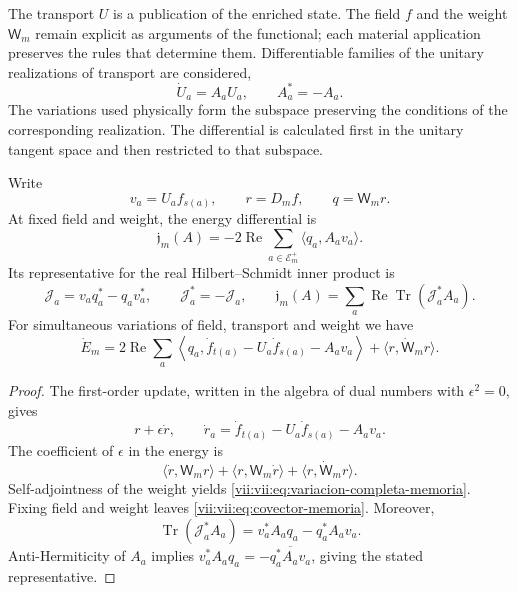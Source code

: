 The transport \(U\) is a publication of the enriched state. The field
\(f\) and the weight \(\mathsf W_m\) remain explicit as arguments
of the functional; each material application preserves the rules that
determine them. Differentiable families of the unitary realizations
of transport are considered,
\[
 \dot U_a=A_aU_a,\qquad A_a^*=-A_a.
\]
The variations used physically form the subspace preserving
the conditions of the corresponding realization. The differential is
calculated first in the unitary tangent space and then restricted
to that subspace.

\begin{proposition}
\label{vii:vii:prop:covector-memoria}
Write
\[
 v_a=U_af_{s(a)},\qquad r=D_mf,\qquad q=\mathsf W_mr.
\]
At fixed field and weight, the energy differential is
\begin{equation}
 \mathfrak j_m(A)=-2\operatorname{Re}
       \sum_{a\in\mathcal E_m^+}\langle q_a,A_av_a\rangle .
 \label{vii:vii:eq:covector-memoria}
\end{equation}
Its representative for the real Hilbert--Schmidt inner product is
\begin{equation}
 \mathcal J_a=v_aq_a^*-q_av_a^*,\qquad
 \mathcal J_a^*=-\mathcal J_a,\qquad
 \mathfrak j_m(A)=
 \sum_a\operatorname{Re}\operatorname{Tr}(\mathcal J_a^*A_a).
 \label{vii:vii:eq:representante-corriente-discreta}
\end{equation}
For simultaneous variations of field, transport and weight we have
\begin{equation}
 \dot E_m=
 2\operatorname{Re}\sum_a
 \left\langle q_a,\dot f_{t(a)}-U_a\dot f_{s(a)}-A_av_a\right\rangle
 +\langle r,\dot{\mathsf W}_mr\rangle .
 \label{vii:vii:eq:variacion-completa-memoria}
\end{equation}
\end{proposition}

\begin{proof}
The first-order update, written in the algebra of dual
numbers with \(\epsilon^2=0\), gives
\[
 r+\epsilon\dot r,\qquad
 \dot r_a=\dot f_{t(a)}-U_a\dot f_{s(a)}-A_av_a.
\]
The coefficient of \(\epsilon\) in the energy is
\[
 \langle\dot r,\mathsf W_mr\rangle+
 \langle r,\mathsf W_m\dot r\rangle+
 \langle r,\dot{\mathsf W}_mr\rangle.
\]
Self-adjointness of the weight yields
\eqref{vii:vii:eq:variacion-completa-memoria}. Fixing field and weight leaves
\eqref{vii:vii:eq:covector-memoria}. Moreover,
\[
 \operatorname{Tr}(\mathcal J_a^*A_a)
 =v_a^*A_aq_a-q_a^*A_av_a.
\]
Anti-Hermiticity of \(A_a\) implies
\(v_a^*A_aq_a=-\overline{q_a^*A_av_a}\), giving
the stated representative.
\end{proof}

